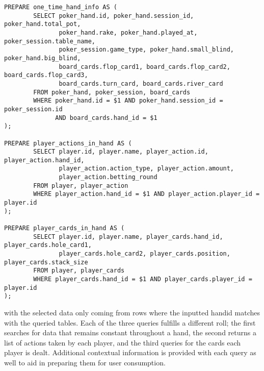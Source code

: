 \documentclass{article}
\begin{document}
        \begin{verbatim}
PREPARE one_time_hand_info AS (
        SELECT poker_hand.id, poker_hand.session_id, poker_hand.total_pot, 
               poker_hand.rake, poker_hand.played_at, poker_session.table_name, 
               poker_session.game_type, poker_hand.small_blind, poker_hand.big_blind, 
               board_cards.flop_card1, board_cards.flop_card2, board_cards.flop_card3,
               board_cards.turn_card, board_cards.river_card
        FROM poker_hand, poker_session, board_cards
        WHERE poker_hand.id = $1 AND poker_hand.session_id = poker_session.id 
              AND board_cards.hand_id = $1
);
                
PREPARE player_actions_in_hand AS (
        SELECT player.id, player.name, player_action.id, player_action.hand_id, 
               player_action.action_type, player_action.amount, 
               player_action.betting_round
        FROM player, player_action
        WHERE player_action.hand_id = $1 AND player_action.player_id = player.id
);
                
PREPARE player_cards_in_hand AS (
        SELECT player.id, player.name, player_cards.hand_id, player_cards.hole_card1, 
               player_cards.hole_card2, player_cards.position, player_cards.stack_size
        FROM player, player_cards
        WHERE player_cards.hand_id = $1 AND player_cards.player_id = player.id
);
        \end{verbatim}
        with the selected data only coming from rows where the inputted hand\textunderscore id matches with the queried tables.
        Each of the three queries fulfills a different roll; the first searches for data that remains constant throughout a hand,
        the second returns a list of actions taken by each player, and the third queries for the cards each player is dealt. Additional
        contextual information is provided with each query as well to aid in preparing them for user consumption.
\end{document}
